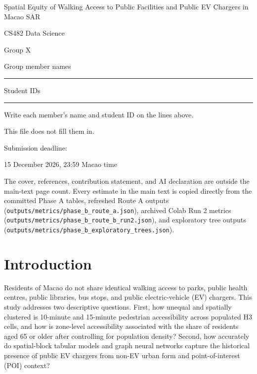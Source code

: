 \documentclass[11pt,a4paper]{article}
\begin{document}
\begin{titlepage}
\centering
\vspace*{18mm}
{\Large Spatial Equity of Walking Access to Public Facilities and Public EV Chargers in Macao SAR\par}
\vspace{1.1em}
{\large CS482 Data Science\par}
\vspace{0.6em}
Group X\par
\vspace{1.5em}
{\normalsize Group member names\par}
\vspace{0.35em}
\rule{0.72\textwidth}{0.4pt}\par
\vspace{1.1em}
{\normalsize Student IDs\par}
\vspace{0.35em}
\rule{0.72\textwidth}{0.4pt}\par
\vspace{0.8em}
{\small Write each member's name and student ID on the lines above.\par This file does not fill them in.\par}
\vspace{1.3em}
{\normalsize Submission deadline:\par 15 December 2026, 23:59 Macao time\par}
\vspace{1.1em}
\begin{minipage}{0.9\textwidth}
\raggedright
\small
The cover, references, contribution statement, and AI declaration are outside the main-text page count. Every estimate in the main text is copied directly from the committed Phase A tables, refreshed Route A outputs (\texttt{outputs/metrics/phase\_b\_route\_a.json}), archived Colab Run 2 metrics (\texttt{outputs/metrics/phase\_b\_route\_b\_run2.json}), and exploratory tree outputs (\texttt{outputs/metrics/phase\_b\_exploratory\_trees.json}).
\end{minipage}
\end{titlepage}

\section{Introduction}
Residents of Macao do not share identical walking access to parks, public health centres, public libraries, bus stops, and public electric-vehicle (EV) chargers. This study addresses two descriptive questions. First, how unequal and spatially clustered is 10-minute and 15-minute pedestrian accessibility across populated H3 cells, and how is zone-level accessibility associated with the share of residents aged 65 or older after controlling for population density? Second, how accurately do spatial-block tabular models and graph neural networks capture the historical presence of public EV chargers from non-EV urban form and point-of-interest (POI) context?
\end{document}
